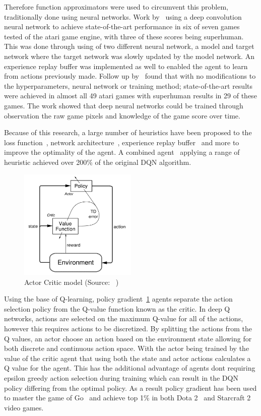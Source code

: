 Therefore function approximators were used to circumvent this problem, traditionally done using neural networks.
Work by~\cite{atari} using a deep convolution neural network to achieve state-of-the-art performance in six of seven
games tested of the atari game engine, with three of these scores being superhuman. This was done through using of two
different neural network, a model and target network where the target network was slowly updated by the model network.
An experience replay buffer was implemented as well to enabled the agent to learn from actions previously made.
Follow up by~\cite{mnih2015humanlevel} found that with no modifications to the hyperparameters, neural network or
training method; state-of-the-art results were achieved in almost all 49 atari games with superhuman results in 29 of
these games. The work showed that deep neural networks could be trained through observation the raw game pixels and
knowledge of the game score over time.

Because of this research, a large number of heuristics have been proposed to the loss function~\citep{doubledqn},
network architecture~\cite{duelingdqn}, experience replay buffer~\citep{prioritizedexperiencereplay} and more to
improve the optimality of the agent. A combined agent~\citep{rainbow} applying a range of heuristic achieved over
200\% of the original DQN algorithm.

\begin{figure}
    \centering
    \includegraphics[width=0.5\textwidth]{figures/actor-critic.png}
    \caption{Actor Critic model (Source: ~\cite{Sutton1998})}
    \label{fig:actor-critic-model}
\end{figure}

Using the base of Q-learning, policy gradient~\ref{fig:actor-critic-model} agents separate the action selection policy
from the Q-value function known as the critic. In deep Q networks, actions are selected on the maximum Q-value for all
of the actions, however this requires actions to be discretized. By splitting the actions from the Q values, an actor
choose an action based on the environment state allowing for both discrete and continuous action space. With the
actor being trained by the value of the critic agent that using both the state and actor actions calculates a Q value
for the agent. This has the additional advantage of agents dont requiring epsilon greedy action selection during
training which can result in the DQN policy differing from the optimal policy. As a result policy gradient has been
used to master the game of Go~\citep{silver2017mastering} and achieve top 1\% in both
Dota 2~\citep{OpenAI_dota} and Starcraft 2~\citep{starcraft2} video games.